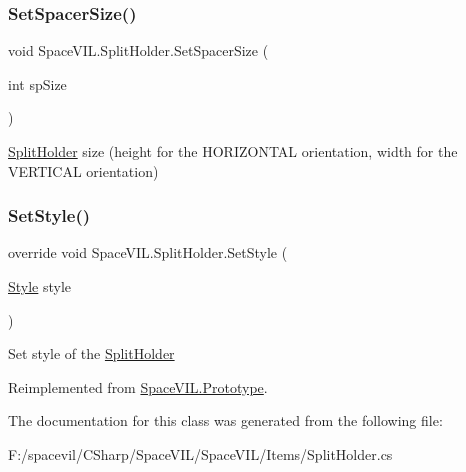 \subsubsection{\texorpdfstring{Set\+Spacer\+Size()}{SetSpacerSize()}}
{\footnotesize\ttfamily void Space\+V\+I\+L.\+Split\+Holder.\+Set\+Spacer\+Size (\begin{DoxyParamCaption}\item[{int}]{sp\+Size }\end{DoxyParamCaption})}



\mbox{\hyperlink{class_space_v_i_l_1_1_split_holder}{Split\+Holder}} size (height for the H\+O\+R\+I\+Z\+O\+N\+T\+AL orientation, width for the V\+E\+R\+T\+I\+C\+AL orientation) 

\mbox{\label{class_space_v_i_l_1_1_split_holder_a0489f7db33f2310761600b11ea308c40}} 
\subsubsection{\texorpdfstring{Set\+Style()}{SetStyle()}}
{\footnotesize\ttfamily override void Space\+V\+I\+L.\+Split\+Holder.\+Set\+Style (\begin{DoxyParamCaption}\item[{\mbox{\hyperlink{class_space_v_i_l_1_1_decorations_1_1_style}{Style}}}]{style }\end{DoxyParamCaption})\hspace{0.3cm}{\ttfamily [virtual]}}



Set style of the \mbox{\hyperlink{class_space_v_i_l_1_1_split_holder}{Split\+Holder}} 



Reimplemented from \mbox{\hyperlink{class_space_v_i_l_1_1_prototype_ae96644a6ace490afb376fb542161e541}{Space\+V\+I\+L.\+Prototype}}.



The documentation for this class was generated from the following file\+:\begin{DoxyCompactItemize}
\item 
F\+:/spacevil/\+C\+Sharp/\+Space\+V\+I\+L/\+Space\+V\+I\+L/\+Items/Split\+Holder.\+cs\end{DoxyCompactItemize}
